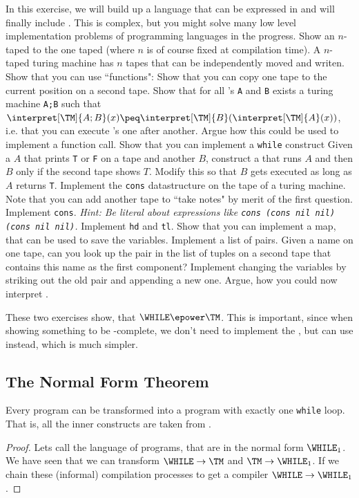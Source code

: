 \begin{Exercise}[title={Interpreter for \WHILE in \TM},difficulty=4]
	In this exercise, we will build up a language that can be expressed in \TM 
	and will finally include \WHILE. This is complex, but you might solve 
	many low level implementation problems of programming languages in the progress.
	\Question Show an $n$-taped \TM to the one taped (where $n$ is of course fixed at
		compilation time). A $n$-taped turing machine has $n$ tapes that can be 
		independently moved and writen.
	\Question Show that you can use ``functions":
		\subQuestion Show that you can copy one tape to the current position on a 
			second tape.
		\subQuestion Show that for all \TM's {\tt A} and {\tt B} exists a turing 
			machine {\tt A;B} such that $\interpret[\TM]{A;B}(x) \peq
			\interpret[\TM]{B}(\interpret[\TM]{A}(x))$, i.e. that you can execute
			\TM's one after another.
		\subQuestion Argue how this could be used to implement a function call.
	\Question Show that you can implement a {\tt while} construct
		\subQuestion Given a \TM $A$ that prints {\tt T} or {\tt F} on a tape and 
			another \TM $B$, construct a  that runs $A$ 
			and then $B$ only if the second tape shows $T$.
		\subQuestion Modify this so that $B$ gets executed as long as $A$ returns {\tt T}.
	\Question Implement the {\tt cons} datastructure on the tape of a turing 
	machine. Note that you can add another tape to ``take notes" by merit of the first question.
		\subQuestion Implement {\tt cons}. {\em Hint: Be literal about 
		expressions like {\tt cons (cons nil nil) (cons nil nil)}.} 
		\subQuestion Implement {\tt hd} and {\tt tl}.
	\Question Show that you can implement a map, that can be used to save the variables.
		\subQuestion Implement a list of pairs.
		\subQuestion Given a name on one tape, can you look up the pair in the 
			list of tuples on a second tape that contains this name as the first
			component?
		\subQuestion Implement changing the variables by striking out the old 
			pair and appending a new one.
	\Question Argue, how you could now interpret \WHILE.
\end{Exercise}

These two exercises show, that $\WHILE\epower\TM$. This is important, since 
when showing something to be \WHILE-complete, we don't need to implement the 
\WHILE, but can use \TM instead, which is much simpler.

\subsection{The Normal Form Theorem}
\begin{theorem}
	Every \WHILE program can be transformed into a \WHILE program with exactly 
	one {\tt while} loop. That is, all the inner constructs are taken from \FOR.
\end{theorem}
\begin{proof}
	Lets call the language of \WHILE programs, that are in the normal form $\WHILE_1$.
	We have seen that we can transform $\WHILE \rightarrow \TM$ and 
	$\TM \rightarrow \WHILE_1$. If we chain these (informal) compilation processes to 
	get a compiler $\WHILE \rightarrow \WHILE_1$.
\end{proof}

